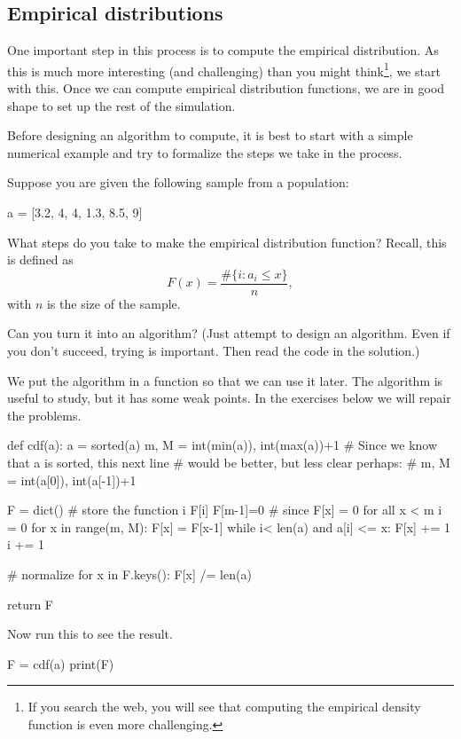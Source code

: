 \subsection{Empirical distributions}
\label{sec:empir-distr}

One important step in this process is to compute the empirical distribution. As this is much more interesting (and challenging) than you might think\footnote{If you search the web, you will see that computing the empirical density function is even more challenging.}, we start with this. Once we can compute empirical distribution functions, we are in good shape to set up the rest of the simulation. 

Before designing an algorithm to compute, it is best to start with a simple numerical example and try to formalize the steps we take in the process.

\begin{exercise}
  Suppose you are given the following sample from a population:
  \begin{pyverbatim}
a = [3.2, 4, 4, 1.3, 8.5, 9]    
\end{pyverbatim}

What steps do you take to make the empirical distribution function? Recall, this is defined as
  \begin{equation}
    \label{eq:1}
    F(x) = \frac{\# \{i : a_i \leq x\}}{n}, 
  \end{equation}
  with $n$ is the size of the sample.

Can you turn it into an algorithm? (Just attempt to design an algorithm. Even if you don't succeed, trying is important. Then read the code in the solution.)

  \begin{solution}
We put the algorithm in a function so that we can use it later.  The algorithm is useful to study,  but it has some weak points. In the exercises below we will repair the problems. 
    \begin{pyverbatim}
def cdf(a):
    a = sorted(a)
    m, M = int(min(a)), int(max(a))+1
    # Since we know that a is sorted, this next line 
    # would be better, but less clear perhaps: 
    # m, M = int(a[0]), int(a[-1])+1 

    F = dict() # store the function i \to F[i]
    F[m-1]=0  # since F[x] = 0 for all x < m
    i = 0
    for x in range(m, M):
        F[x] = F[x-1]
        while i< len(a) and a[i] <= x:
            F[x] += 1
            i += 1

    # normalize
    for x in F.keys(): 
        F[x] /= len(a)

    return F
    \end{pyverbatim}

Now run  this to see the result.
\begin{pyverbatim}
F = cdf(a)
print(F)
\end{pyverbatim}


  \end{solution}
\end{exercise}

